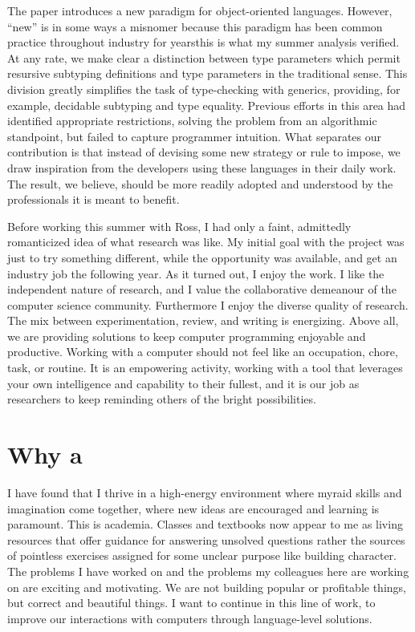 \documentclass{article}
\begin{document}
The paper introduces a new paradigm for object-oriented languages.
However, ``new'' is in some ways a misnomer because this paradigm has been common practice throughout industry for years\textemdash this is what my summer analysis verified.
At any rate, we make clear a distinction between type parameters which permit resursive subtyping definitions and type parameters in the traditional sense.
This division greatly simplifies the task of type-checking with generics, providing, for example, decidable subtyping and type equality.
Previous efforts in this area had identified appropriate restrictions, solving the problem from an algorithmic standpoint, but failed to capture programmer intuition.
What separates our contribution is that instead of devising some new strategy or rule to impose, we draw inspiration from the developers using these languages in their daily work.
The result, we believe, should be more readily adopted and understood by the professionals it is meant to benefit.

Before working this summer with Ross, I had only a faint, admittedly romanticized idea of what research was like.
My initial goal with the project was just to try something different, while the opportunity was available, and get an industry job the following year.
As it turned out, I enjoy the work. 
I like the independent nature of research, and I value the collaborative demeanour of the computer science community.
Furthermore I enjoy the diverse quality of research. 
The mix between experimentation, review, and writing is energizing.
Above all, we are providing solutions to keep computer programming enjoyable and productive.
Working with a computer should not feel like an occupation, chore, task, or routine.
It is an empowering activity, working with a tool that leverages your own intelligence and capability to their fullest, and it is our job as researchers to keep reminding others of the bright possibilities.

\section{Why a \phd}
I have found that I thrive in a high-energy environment where myraid skills and imagination come together, where new ideas are encouraged and learning is paramount.
This is academia.
Classes and textbooks now appear to me as living resources that offer guidance for answering unsolved questions rather the sources of pointless exercises assigned for some unclear purpose like building character.
The problems I have worked on and the problems my colleagues here are working on are exciting and motivating.
We are not building popular or profitable things, but correct and beautiful things.
I want to continue in this line of work, to improve our interactions with computers through language-level solutions.
\end{document}
